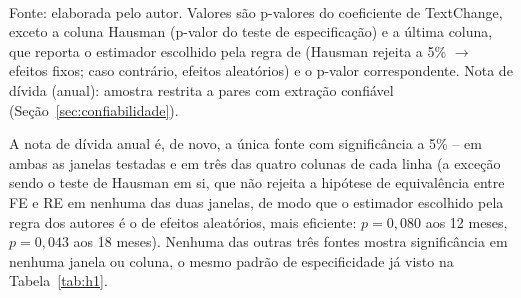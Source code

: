 \documentclass[a4paper,12pt]{report}
\begin{document}
\begin{table}[htbp]
    \centering
    \caption{Retorno anormal sob o desenho metodológico de Santos e Coelho (2018), universo expandido}
    \label{tab:santoscoelho}
    \small
    \\[0.3cm]
    {\footnotesize Fonte: elaborada pelo autor. Valores são p-valores do coeficiente de TextChange, exceto a coluna Hausman (p-valor do teste de especificação) e a última coluna, que reporta o estimador escolhido pela regra de  (Hausman rejeita a 5\% $\rightarrow$ efeitos fixos; caso contrário, efeitos aleatórios) e o p-valor correspondente. Nota de dívida (anual): amostra restrita a pares com extração confiável (Seção~\ref{sec:confiabilidade}).}
\end{table}

A nota de dívida anual é, de novo, a única fonte com significância a 5\% -- em ambas as janelas testadas e em três das quatro colunas de cada linha (a exceção sendo o teste de Hausman em si, que não rejeita a hipótese de equivalência entre FE e RE em nenhuma das duas janelas, de modo que o estimador escolhido pela regra dos autores é o de efeitos aleatórios, mais eficiente: $p=0{,}080$ aos 12 meses, $p=0{,}043$ aos 18 meses). Nenhuma das outras três fontes mostra significância em nenhuma janela ou coluna, o mesmo padrão de especificidade já visto na Tabela~\ref{tab:h1}.
\end{document}
